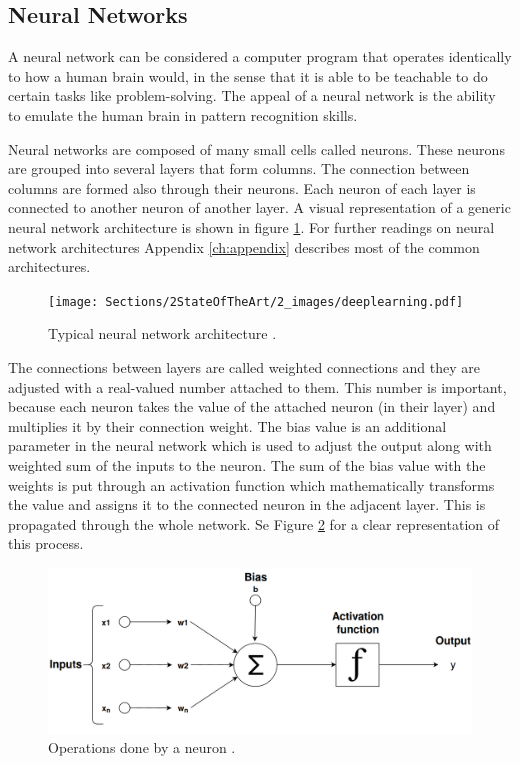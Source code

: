 \subsection{Neural Networks}
\label{sec:neuralnet}

    \par A neural network can be considered a computer program that operates identically to how a human brain would, in the sense that it is able to be teachable to do certain tasks like problem-solving. The appeal of a neural network is the ability to emulate the human brain in pattern recognition skills. 


    \par Neural networks are composed of many small cells called neurons. These neurons are grouped into several layers that form columns. The connection between columns are formed also through their neurons. Each neuron of each layer is connected to another neuron of another layer. A visual representation of a generic neural network architecture is shown in figure \ref{fig:neural}. For further readings on neural network architectures Appendix \ref{ch:appendix} describes most of the common architectures.


    \begin{figure}[htb]
        \centering
        \texttt{[image: Sections/2StateOfTheArt/2\_images/deeplearning.pdf]}
        \caption{Typical neural network architecture \cite{mathworks_NN}.}
        \label{fig:neural}
    \end{figure}
        
    
    \par The connections between layers are called weighted connections and they are adjusted with a real-valued number attached to them. This number is important, because each neuron takes the value of the attached neuron (in their layer) and multiplies it by their connection weight. The bias value is an additional parameter in the neural network which is used to adjust the output along with weighted sum of the inputs to the neuron. The sum of the bias value with the weights  is put through an activation function which mathematically transforms the value and assigns it to the connected neuron in the adjacent layer. This is propagated through the whole network.  Se Figure \ref{fig:neuron} for a clear representation of this process.
    

    
    \begin{figure}[htb]
        \centering
        \includegraphics[scale = 0.15]{Sections/2StateOfTheArt/2_images/neuron.png}
        \caption{ Operations done by a neuron \cite{neuron}.}
        \label{fig:neuron}
    \end{figure}
    

